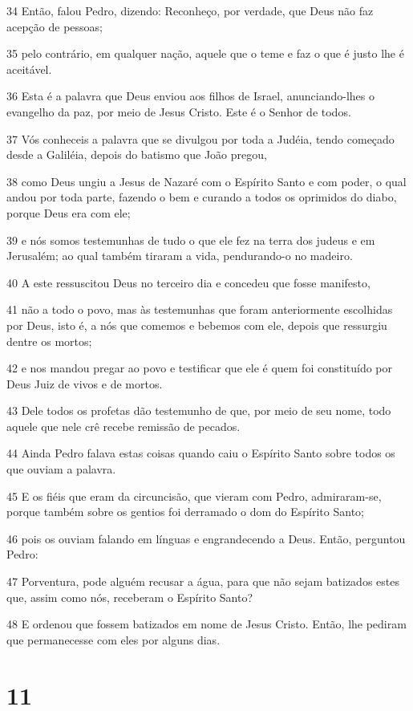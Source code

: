 \par 34 Então, falou Pedro, dizendo: Reconheço, por verdade, que Deus não faz acepção de pessoas;
\par 35 pelo contrário, em qualquer nação, aquele que o teme e faz o que é justo lhe é aceitável.
\par 36 Esta é a palavra que Deus enviou aos filhos de Israel, anunciando-lhes o evangelho da paz, por meio de Jesus Cristo. Este é o Senhor de todos.
\par 37 Vós conheceis a palavra que se divulgou por toda a Judéia, tendo começado desde a Galiléia, depois do batismo que João pregou,
\par 38 como Deus ungiu a Jesus de Nazaré com o Espírito Santo e com poder, o qual andou por toda parte, fazendo o bem e curando a todos os oprimidos do diabo, porque Deus era com ele;
\par 39 e nós somos testemunhas de tudo o que ele fez na terra dos judeus e em Jerusalém; ao qual também tiraram a vida, pendurando-o no madeiro.
\par 40 A este ressuscitou Deus no terceiro dia e concedeu que fosse manifesto,
\par 41 não a todo o povo, mas às testemunhas que foram anteriormente escolhidas por Deus, isto é, a nós que comemos e bebemos com ele, depois que ressurgiu dentre os mortos;
\par 42 e nos mandou pregar ao povo e testificar que ele é quem foi constituído por Deus Juiz de vivos e de mortos.
\par 43 Dele todos os profetas dão testemunho de que, por meio de seu nome, todo aquele que nele crê recebe remissão de pecados.
\par 44 Ainda Pedro falava estas coisas quando caiu o Espírito Santo sobre todos os que ouviam a palavra.
\par 45 E os fiéis que eram da circuncisão, que vieram com Pedro, admiraram-se, porque também sobre os gentios foi derramado o dom do Espírito Santo;
\par 46 pois os ouviam falando em línguas e engrandecendo a Deus. Então, perguntou Pedro:
\par 47 Porventura, pode alguém recusar a água, para que não sejam batizados estes que, assim como nós, receberam o Espírito Santo?
\par 48 E ordenou que fossem batizados em nome de Jesus Cristo. Então, lhe pediram que permanecesse com eles por alguns dias.

\chapter{11}

